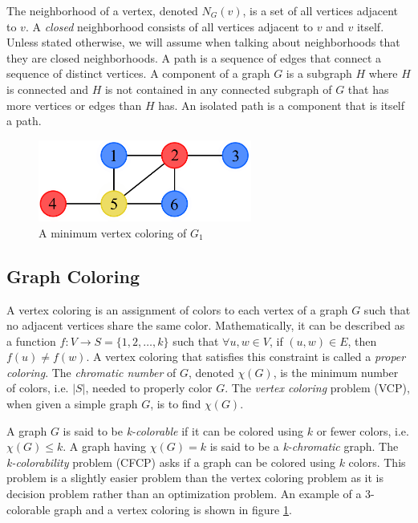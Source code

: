 \documentclass{sig-alternate}
\begin{document}
The neighborhood of a vertex, denoted $N_G(v)$, is a set of all vertices adjacent to $v$. A \emph{closed} neighborhood consists of all vertices adjacent to $v$ and $v$ itself. Unless stated otherwise, we will assume when talking about neighborhoods that they are closed neighborhoods. A path is a sequence of edges that connect a sequence of distinct vertices. A component of a graph $G$ is a subgraph $H$ where $H$ is connected and $H$ is not contained in any connected subgraph of $G$ that has more vertices or edges than $H$ has. An isolated path is a component that is itself a path. \cite{bondy1976graph}

\begin{figure}[h]
	\centering
	\includegraphics[width=7cm]{../figures/example-vcp.pdf}
	\caption{A minimum vertex coloring of $G_1$}\label{fig:vcp-example}
\end{figure}


\subsection{Graph Coloring}
\label{sec:coloring}
A vertex coloring is an assignment of colors to each vertex of a graph $G$ such that no adjacent vertices share the same color. Mathematically, it can be described as a function $f : V \rightarrow S = \{1, 2, \dots, k\}$ such that $\forall u,w \in V$, if $(u,w) \in E$, then $f(u) \neq f(w)$. A vertex coloring that satisfies this constraint is called a \emph{proper coloring}. The \emph{chromatic number} of $G$, denoted $\chi(G)$, is the minimum number of colors, i.e. $|S|$, needed to properly color $G$. The \emph{vertex coloring} problem (VCP), when given a simple graph $G$, is to find $\chi(G)$. \cite{bondy1976graph}

A graph $G$ is said to be \emph{k-colorable} if it can be colored using $k$ or fewer colors, i.e. $\chi(G) \leq k$. A graph having $\chi(G) = k$ is said to be a \emph{k-chromatic} graph. The \emph{k-colorability} problem (CFCP) asks if a graph can be colored using $k$ colors. This problem is a slightly easier problem than the vertex coloring problem as it is decision problem rather than an optimization problem. An example of a 3-colorable graph and a vertex coloring is shown in figure \ref{fig:vcp-example}.
\end{document}
